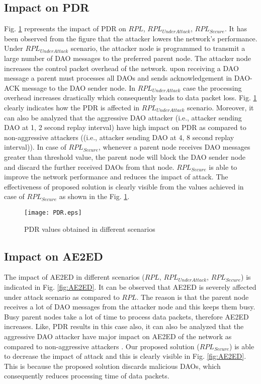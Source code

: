\documentclass[conference, a4paper]{IEEEtran}
\begin{document}
\subsection{Impact on PDR}
Fig. \ref{fig:PDR} represents the impact of PDR on $RPL$, $RPL_{Under Attack}$, $RPL_{Secure}$. It has been observed from the figure that the attacker lowers the network's performance. Under  $RPL_{Under Attack}$ scenario, the attacker node is programmed to transmit a large number of DAO messages to the preferred parent node. The attacker node increases the control packet overhead of the network. upon receiving a DAO message a parent must processes all DAOs and sends acknowledgement in DAO-ACK message to the DAO sender node. In $RPL_{Under Attack}$ case the processing overhead increases drastically which consequently leads to data packet loss. Fig. \ref{fig:PDR} clearly indicates how the PDR is affected in $RPL_{Under Attack}$ scenario. Moreover, it can also be analyzed that the aggressive DAO attacker (i.e., attacker sending DAO at 1, 2 second replay interval) have high impact on PDR as compared to non-aggressive attackers ((i.e., attacker sending DAO at 4, 8 second replay interval)). In case of $RPL_{Secure}$, whenever a parent node receives DAO messages greater than threshold value, the parent node will block the DAO sender node and discard the further received DAOs from that node. $RPL_{Secure}$ is able to improve the network performance and reduces the impact of attack. The effectiveness of proposed solution is clearly visible from the values achieved in case of $RPL_{Secure}$ as shown in the Fig. \ref{fig:PDR}.

\begin{figure}[h]
    \centering
    \texttt{[image: PDR.eps]}
    \caption{PDR values obtained in different scenarios}
    \label{fig:PDR}
\end{figure}

\subsection{Impact on AE2ED}
The impact of AE2ED in different scenarios ($RPL$, $RPL_{Under Attack}$, $RPL_{Secure}$) is indicated in Fig. \ref{fig:AE2ED}. It can be observed that AE2ED is severely affected under attack scenario as compared to $RPL$. The reason is that the parent node receives a lot of DAO messages from the attacker node and this keeps them busy. Busy parent nodes take a lot of time to process data packets, therefore AE2ED increases. Like, PDR results in this case also, it can also be analyzed that the aggressive DAO attacker have major impact on AE2ED of the network as compared to non-aggressive attackers . Our proposed solution ($RPL_{Secure}$) is able to decrease the impact of attack and this is clearly visible in Fig. \ref{fig:AE2ED}. This is because the proposed solution discards malicious DAOs, which consequently reduces processing time of data packets.
\end{document}

